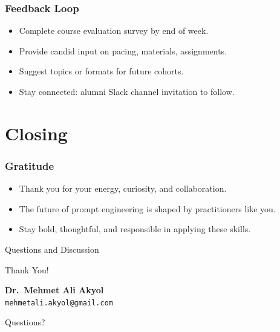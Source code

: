 \documentclass{beamer}
\begin{document}
\begin{frame}
    \frametitle{Feedback Loop}
    \begin{itemize}
        \item Complete course evaluation survey by end of week.
        \item Provide candid input on pacing, materials, assignments.
        \item Suggest topics or formats for future cohorts.
        \item Stay connected: alumni Slack channel invitation to follow.
    \end{itemize}
\end{frame}

\section{Closing}

\begin{frame}
    \frametitle{Gratitude}
    \begin{itemize}
        \item Thank you for your energy, curiosity, and collaboration.
        \item The future of prompt engineering is shaped by practitioners like you.
        \item Stay bold, thoughtful, and responsible in applying these skills.
    \end{itemize}
\end{frame}

\begin{frame}{Questions and Discussion}
    \begin{center}
    {\Huge Thank You!}
    \vspace{1cm}

        \textbf{Dr.\ Mehmet Ali Akyol}\\
        \texttt{mehmetali.akyol@gmail.com}
    \vspace{1cm}

    {\large Questions?}
    \end{center}
\end{frame}
\end{document}
